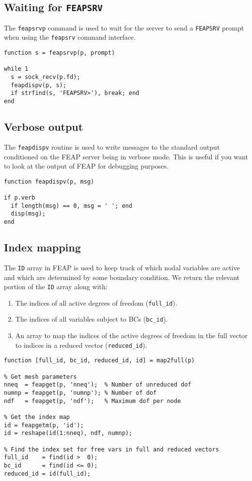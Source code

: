\subsection{Waiting for {\tt FEAPSRV}}

The {\tt feapsrvp} command is used to wait for the server to send
a {\tt FEAPSRV} prompt when using the {\tt feapsrv} command
interface.

\begin{verbatim}
function s = feapsrvp(p, prompt)

while 1
  s = sock_recv(p.fd);
  feapdispv(p, s);
  if strfind(s, 'FEAPSRV>'), break; end
end
\end{verbatim}
\subsection{Verbose output}

The {\tt feapdispv} routine is used to write messages to the
standard output conditioned on the FEAP server being in verbose
mode.  This is useful if you want to look at the output of FEAP
for debugging purposes.

\begin{verbatim}
function feapdispv(p, msg)

if p.verb
  if length(msg) == 0, msg = ' '; end 
  disp(msg);
end
\end{verbatim}
\subsection{Index mapping}

The {\tt ID} array in FEAP is used to keep track of which nodal
variables are active and which are determined by some boundary
condition.  We return the relevant portion of the {\tt ID} array
along with:
\begin{enumerate}
\item 
The indices of all active degrees of freedom ({\tt full\_id}).
\item
The indices of all variables subject to BCs ({\tt bc\_id}).
\item
An array to map the indices of the active degrees of freedom
in the full vector to indices in a reduced vector ({\tt reduced\_id}).
\end{enumerate}

\begin{verbatim}
function [full_id, bc_id, reduced_id, id] = map2full(p)

% Get mesh parameters
nneq  = feapget(p, 'nneq');  % Number of unreduced dof
numnp = feapget(p, 'numnp'); % Number of dof
ndf   = feapget(p, 'ndf');   % Maximum dof per node

% Get the index map
id = feapgetm(p, 'id');
id = reshape(id(1:nneq), ndf, numnp);

% Find the index set for free vars in full and reduced vectors
full_id    = find(id >  0);
bc_id      = find(id <= 0);
reduced_id = id(full_id);
\end{verbatim}
